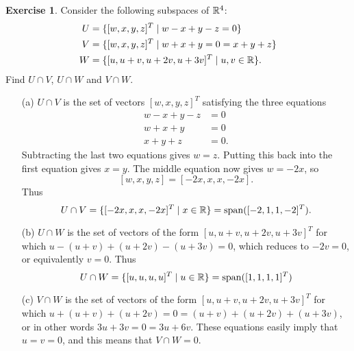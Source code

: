 \documentclass[a4paper]{amsart}
\theoremstyle{definition}
\newtheorem{exercise}{Exercise}
\newenvironment{solution}{{\noindent \bf Solution:}}{}
\begin{document}
\begin{exercise}\label{ex-subspaces-R-three}
 Consider the following subspaces of ${\mathbb{R}}^4$:
 \begin{align*}
  U &= \{ [w,x,y,z]^T \;|\; w-x+y-z=0 \} \\
  V &= \{ [w,x,y,z]^T \;|\; w+x+y=0=x+y+z \} \\
  W &= \{ [u,u+v,u+2v,u+3v]^T \;|\; u,v\in{\mathbb{R}}\}.
 \end{align*}
 Find $U\cap V$, $U\cap W$ and $V\cap W$.
\end{exercise}
\begin{solution}
 \begin{itemize}
  \item[(a)] $U\cap V$ is the set of vectors $[w,x,y,z]^T$
   satisfying the three equations
   \begin{align*}
    w-x+y-z &= 0 \\
    w+x+y &= 0 \\
    x+y+z &= 0.
   \end{align*}
   Subtracting the last two equations gives $w=z$.  Putting
   this back into the first equation gives $x=y$.  The
   middle equation now gives $w=-2x$, so 
   \[ [w,x,y,z] = [-2x,x,x,-2x]. \]
   Thus 
   \[ U\cap V = \{ [-2x,x,x,-2x]^T \;|\; x\in{\mathbb{R}}\} = 
       \operatorname{span}([-2,1,1,-2]^T).
   \]
  \item[(b)] $U\cap W$ is the set of vectors of the form
   $[u,u+v,u+2v,u+3v]^T$ for which
   $u-(u+v)+(u+2v)-(u+3v)=0$, which reduces to $-2v=0$, or
   equivalently $v=0$.  Thus 
   \[ U\cap W = \{[u,u,u,u]^T\;|\; u\in{\mathbb{R}}\} = 
       \operatorname{span}([1,1,1,1]^T) 
   \]
  \item[(c)] $V\cap W$ is the set of vectors of the form 
   $[u,u+v,u+2v,u+3v]^T$ for which
   $u+(u+v)+(u+2v)=0=(u+v)+(u+2v)+(u+3v)$, or in other words
   $3u+3v=0=3u+6v$.  These equations easily imply that
   $u=v=0$, and this means that $V\cap W=0$.
 \end{itemize}
\end{solution}
\end{document}
